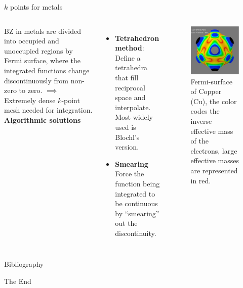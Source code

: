 \documentclass[aspectratio=169]{beamer}
\begin{document}
    \begin{frame}{$k$ points for metals}
        \begin{columns}
            BZ in metals are divided into occupied and unoccupied regions by Fermi surface, where the integrated functions change discontinuously from non-zero to zero. $\implies$ Extremely dense $k$-point mesh needed for integration.
            \textbf{Algorithmic solutions}
            \begin{itemize}
                \item \textbf{Tetrahedron method}: Define a tetrahedra that fill reciprocal space and interpolate. Most widely used is Blochl's version.
                \item \textbf{Smearing} Force the function being integrated to be continuous by ``smearing'' out the discontinuity.
            \end{itemize}

            \begin{figure}
                \centering
                \includegraphics[width=0.6\linewidth]{lectures/figures/7_Cu_fermi_surface.png}
                \caption{Fermi-surface of Copper (Cu), the color codes the inverse effective mass of the electrons, large effective masses are represented in red.\cite{weismannSeeingFermiSurface2009}}
            \end{figure}

        \end{columns}
    \end{frame}


    \begin{frame}[allowframebreaks]{Bibliography}
        
        
    \end{frame}



    \begin{frame}
        \Huge{\centerline{The End}}
    \end{frame}
\end{document}

